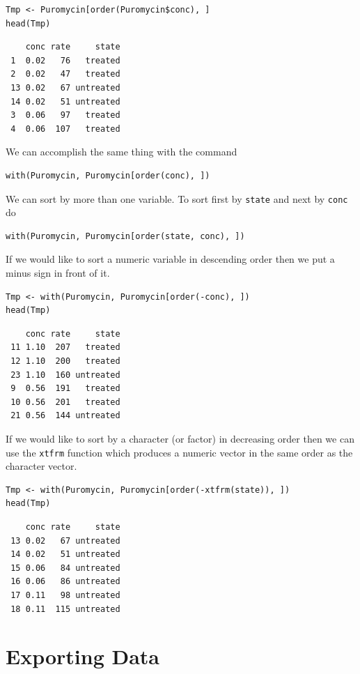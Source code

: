 \documentclass[captions=tableheading]{scrbook}
\begin{document}
\begin{verbatim}
Tmp <- Puromycin[order(Puromycin$conc), ]
head(Tmp)
\end{verbatim}

\begin{verbatim}
    conc rate     state
 1  0.02   76   treated
 2  0.02   47   treated
 13 0.02   67 untreated
 14 0.02   51 untreated
 3  0.06   97   treated
 4  0.06  107   treated
\end{verbatim}

We can accomplish the same thing with the command 


\begin{verbatim}
with(Puromycin, Puromycin[order(conc), ])
\end{verbatim}

We can sort by more than one variable. To sort first by \texttt{state} and next by \texttt{conc} do 


\begin{verbatim}
with(Puromycin, Puromycin[order(state, conc), ])
\end{verbatim}

If we would like to sort a numeric variable in descending order then we put a minus sign in front of it. 


\begin{verbatim}
Tmp <- with(Puromycin, Puromycin[order(-conc), ])
head(Tmp)
\end{verbatim}

\begin{verbatim}
    conc rate     state
 11 1.10  207   treated
 12 1.10  200   treated
 23 1.10  160 untreated
 9  0.56  191   treated
 10 0.56  201   treated
 21 0.56  144 untreated
\end{verbatim}

If we would like to sort by a character (or factor) in decreasing order then we can use the \texttt{xtfrm} function which produces a numeric vector in the same order as the character vector.


\begin{verbatim}
Tmp <- with(Puromycin, Puromycin[order(-xtfrm(state)), ])
head(Tmp)
\end{verbatim}

\begin{verbatim}
    conc rate     state
 13 0.02   67 untreated
 14 0.02   51 untreated
 15 0.06   84 untreated
 16 0.06   86 untreated
 17 0.11   98 untreated
 18 0.11  115 untreated
\end{verbatim}
\section{Exporting Data \label{sec:Exporting-a-Data}}
\label{sec-20-5}
\end{document}
